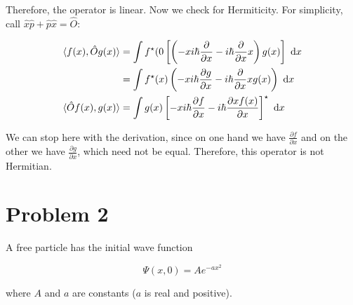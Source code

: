 \documentclass{article}
\begin{document}
\begin{enumerate}[label=(\alph*)]
\begin{solution}
        Therefore, the operator is linear. Now we check for Hermiticity. For simplicity, call $\hat x \hat p + \hat p \hat x = \hat O$:


        \begin{align*}
            \langle f(x), \hat O g(x) \rangle &= \int f^\star(0 \left[\left( - xi\hbar \frac{\partial}{\partial x} - i\hbar \frac{\partial}{\partial x} x\right) g(x)\right] \ \mathrm d x\\
            &= \int f^\star(x) \left(-xi\hbar \frac{\partial g}{\partial x} - i\hbar \frac{\partial}{\partial x} xg(x)\right) \ \mathrm d x\\
            \langle \hat O f(x), g(x) \rangle &= \int g(x) \left[-xi\hbar \frac{\partial f}{\partial x} - i\hbar \frac{\partial xf(x)}{\partial x}\right]^\star \ \mathrm d x
        \end{align*}

        We can stop here with the derivation, since on one hand we have $\frac{\partial f}{\partial x}$ and on the other we have $\frac{\partial g}{\partial x}$, which need not be equal. Therefore, this operator is not Hermitian.
    \end{solution}
\end{enumerate}

\pagebreak
\section*{Problem 2}

A free particle has the initial wave function 

\[ \Psi(x, 0)= Ae^{-ax^2}\]

where $A$ and $a$ are constants ($a$ is real and positive).
\end{document}
